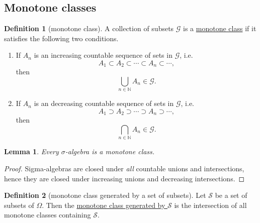 \documentclass[a4paper]{scrartcl}
\newcommand{\N}{\mathbb{N}}
\newcommand{\defn}[1]{\ul{#1}}
\theoremstyle{definition}
\newtheorem{definition}{Definition}[section]
\theoremstyle{plain}
\newtheorem{lemma}{Lemma}[section]
\theoremstyle{remark}
\begin{document}
\subsection{Monotone classes}

\begin{definition}[monotone class]
  \label{def:monotoneclass}
  A collection of subsets $\mathcal{G}$ is a \defn{monotone class} if it satisfies the following two conditions.
  \begin{enumerate}
    \item If $A_{n}$ is an increasing countable sequence of sets in $\mathcal{G}$, i.e.\
      \begin{equation*}
        A_{1} \subset A_{2} \subset \cdots \subset A_{n} \subset \cdots,
      \end{equation*}
      then
      \begin{equation*}
        \bigcup_{n \in \N} A_{n} \in \mathcal{G}.
      \end{equation*}

    \item If $A_{n}$ is an decreasing countable sequence of sets in $\mathcal{G}$, i.e.\
      \begin{equation*}
        A_{1} \supset A_{2} \supset \cdots \supset A_{n} \supset \cdots,
      \end{equation*}
      then
      \begin{equation*}
        \bigcap_{n \in \N} A_{n} \in \mathcal{G}.
      \end{equation*}
  \end{enumerate}
\end{definition}

\begin{lemma}
  Every $\sigma$-algebra is a monotone class.
\end{lemma}
\begin{proof}
  Sigma-algebras are closed under \emph{all} countable unions and intersections, hence they are closed under increasing unions and decreasing intersections.
\end{proof}

\begin{definition}[monotone class generated by a set of subsets]
  \label{def:monotoneclassgeneratedbyaset}
  Let $\mathcal{S}$ be a set of subsets of $\Omega$. Then the \defn{monotone class generated by $\mathcal{S}$} is the intersection of all monotone classes containing $\mathcal{S}$.
\end{definition}
\end{document}
